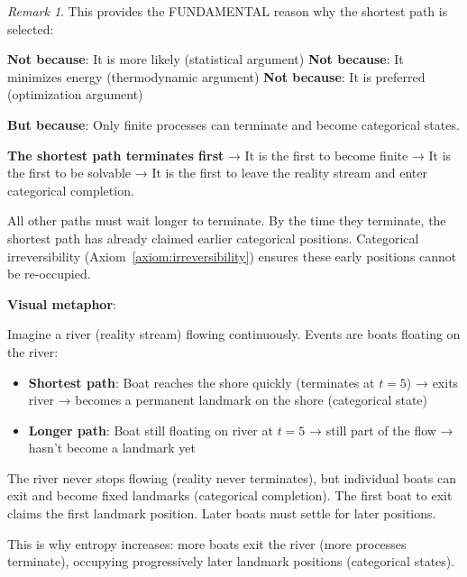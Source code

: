 \documentclass[12pt,a4paper]{article}
\theoremstyle{remark}
\newtheorem{remark}[theorem]{Remark}
\begin{document}
\begin{remark}
This provides the FUNDAMENTAL reason why the shortest path is selected:

\textbf{Not because}: It is more likely (statistical argument)
\textbf{Not because}: It minimizes energy (thermodynamic argument)  
\textbf{Not because}: It is preferred (optimization argument)

\textbf{But because}: Only finite processes can terminate and become categorical states.

\textbf{The shortest path terminates first} → It is the first to become finite → It is the first to be solvable → It is the first to leave the reality stream and enter categorical completion.

All other paths must wait longer to terminate. By the time they terminate, the shortest path has already claimed earlier categorical positions. Categorical irreversibility (Axiom~\ref{axiom:irreversibility}) ensures these early positions cannot be re-occupied.

\textbf{Visual metaphor}:

Imagine a river (reality stream) flowing continuously. Events are boats floating on the river:
\begin{itemize}
\item \textbf{Shortest path}: Boat reaches the shore quickly (terminates at $t=5$) → exits river → becomes a permanent landmark on the shore (categorical state)
\item \textbf{Longer path}: Boat still floating on river at $t=5$ → still part of the flow → hasn't become a landmark yet
\end{itemize}

The river never stops flowing (reality never terminates), but individual boats can exit and become fixed landmarks (categorical completion). The first boat to exit claims the first landmark position. Later boats must settle for later positions.

This is why entropy increases: more boats exit the river (more processes terminate), occupying progressively later landmark positions (categorical states).
\end{remark}
\end{document}
